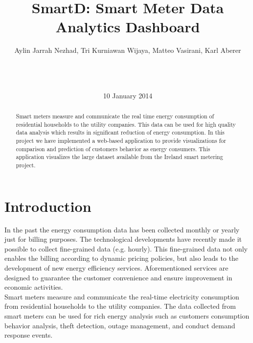 \documentclass{sig-alternate-10pt}
\begin{document}
\title{SmartD: Smart Meter Data Analytics Dashboard}

\author{
\alignauthor
Aylin Jarrah Nezhad, Tri Kurniawan Wijaya, Matteo Vasirani, Karl Aberer\\ 
       \\
       \\
       \\
\date{10 January 2014}
}
\maketitle

\begin{abstract}

Smart meters measure and communicate the real time energy consumption of  residential households to the utility companies. This data can be used for high quality data analysis which results in significant reduction of energy consumption. In this project we have implemented a web-based application to provide visualizations for comparison and prediction of customers behavior as energy consumers. This application visualizes the large dataset available from the Ireland smart metering project.

\end{abstract}


\section{Introduction} 

In the past the energy consumption data has been collected monthly or yearly just for billing purposes. The technological developments have recently made it possible to collect fine-grained data (e.g. hourly). This fine-grained data not only enables the billing according to dynamic pricing policies, but also leads to the development of new energy efficiency services. Aforementioned services are designed to guarantee the customer convenience and ensure improvement in economic activities.\\

Smart meters measure and communicate the real-time electricity consumption from residential households to the utility companies. The data collected from smart meters can be used for rich energy analysis such as customers consumption behavior analysis, theft detection, outage management, and conduct demand response events.\\
\end{document}
